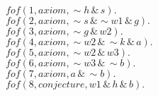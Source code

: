 \documentclass{article}
\begin{document}
$fof(1,axiom, \sim h \, \& \, s).$\\
$fof(2,axiom, \sim s \, \& \sim w1 \, \& \, g).$\\
$fof(3,axiom, \sim g \, \& \, w2).$\\
$fof(4,axiom, \sim w2 \, \& \, \sim k \, \& \, a).$\\
$fof(5,axiom, \sim w2 \, \& \, w3).$\\
$fof(6,axiom, \sim w3 \, \& \, \sim b).$\\
$fof(7,axiom, a \, \& \, \sim b).$\\
$fof(8,conjecture, w1 \, \& \, h \, \& \, b).$
\end{document}
